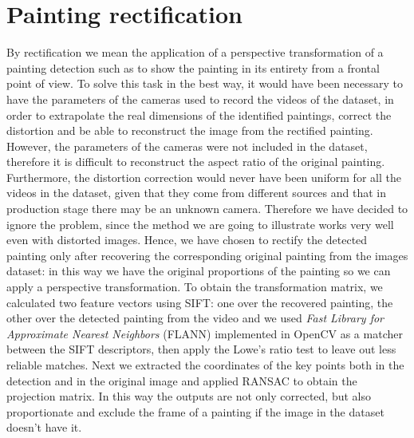 \documentclass[10pt,twocolumn,letterpaper]{article}
\begin{document}
\section{Painting rectification}
\label{sec:PaintingRectification}
By rectification we mean the application of a perspective transformation of a painting detection such as to show the painting in its entirety from a frontal point of view. To solve this task in the best way, it would have been necessary to have the parameters of the cameras used to record the videos of the dataset, in order to extrapolate the real dimensions of the identified paintings, correct the distortion and be able to reconstruct the image from the rectified painting. However, the parameters of the cameras were not included in the dataset, therefore it is difficult to reconstruct the aspect ratio of the original painting. Furthermore, the distortion correction would never have been uniform for all the videos in the dataset, given that they come from different sources and that in production stage there may be an unknown camera. Therefore we have decided to ignore the problem, since the method we are going to illustrate works very well even with distorted images.
Hence, we have chosen to rectify the detected painting only after recovering the corresponding original painting from the images dataset: in this way we have the original proportions of the painting so we can apply a perspective transformation. To obtain the transformation matrix, we calculated two feature vectors using SIFT: one over the recovered painting, the other over the detected painting from the video and we used \textit{Fast Library for Approximate Nearest Neighbors} (FLANN) implemented in OpenCV as a matcher between the SIFT descriptors, then apply the Lowe's ratio test to leave out less reliable matches. Next we extracted the coordinates of the key points both in the detection and in the original image and applied RANSAC \cite{10.1145/358669.358692} to obtain the projection matrix. In this way the outputs are not only corrected, but also proportionate and exclude the frame of a painting if the image in the dataset doesn't have it.
\end{document}
